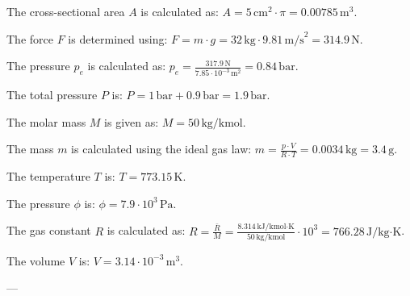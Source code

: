 The cross-sectional area \( A \) is calculated as:  
\( A = 5 \, \text{cm}^2 \cdot \pi = 0.00785 \, \text{m}^3 \).  

The force \( F \) is determined using:  
\( F = m \cdot g = 32 \, \text{kg} \cdot 9.81 \, \text{m/s}^2 = 314.9 \, \text{N} \).  

The pressure \( p_e \) is calculated as:  
\( p_e = \frac{317.9 \, \text{N}}{7.85 \cdot 10^{-3} \, \text{m}^2} = 0.84 \, \text{bar} \).  

The total pressure \( P \) is:  
\( P = 1 \, \text{bar} + 0.9 \, \text{bar} = 1.9 \, \text{bar} \).  

The molar mass \( M \) is given as:  
\( M = 50 \, \text{kg/kmol} \).  

The mass \( m \) is calculated using the ideal gas law:  
\( m = \frac{p \cdot V}{R \cdot T} = 0.0034 \, \text{kg} = 3.4 \, \text{g} \).  

The temperature \( T \) is:  
\( T = 773.15 \, \text{K} \).  

The pressure \( \phi \) is:  
\( \phi = 7.9 \cdot 10^3 \, \text{Pa} \).  

The gas constant \( R \) is calculated as:  
\( R = \frac{\bar{R}}{M} = \frac{8.314 \, \text{kJ/kmol·K}}{50 \, \text{kg/kmol}} \cdot 10^3 = 766.28 \, \text{J/kg·K} \).  

The volume \( V \) is:  
\( V = 3.14 \cdot 10^{-3} \, \text{m}^3 \).  

---